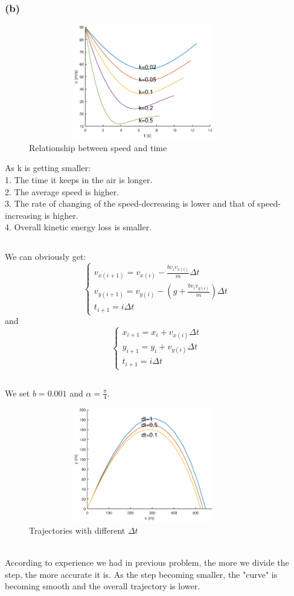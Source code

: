 \documentclass{article}
\begin{document}
\subsubsection*{(b)}
\begin{figure}[!htb] 
\centering 
\includegraphics[height=5cm,width=10cm]{linear_figure4_2.eps}
\caption{Relationship between speed and time}
\end{figure}
\noindent As k is getting smaller:\\
1. The time it keeps in the air is longer.\\
2. The average speed is higher.\\
3. The rate of changing of the speed-decreasing is lower and that of speed-increasing is higher. \\
4. Overall kinetic energy loss is smaller.
\subsection{}
We can obviously get:
$$\begin{cases}
v_{x(i+1)}=v_{x(i)}-\frac{bv_iv_{x(i)}}{m}\Delta t\\
v_{y(i+1)}=v_{y(i)}-(g+\frac{bv_iv_{y(i)}}{m})\Delta t\\
t_{i+1}=i\Delta t
\end{cases}$$
and
$$\begin{cases}
x_{i+1}=x_i+v_{x(i)}\Delta t\\
y_{i+1}=y_i+v_{y(i)}\Delta t\\
t_{i+1}=i\Delta t
\end{cases}$$
\subsection{}
We set $b=0.001$ and $\alpha=\frac{\pi}{4}$.
\begin{figure}[!htb] 
\centering 
\includegraphics[height=5cm,width=10cm]{linear_figure6.eps}
\caption{Trajectories with different $\Delta t$}
\end{figure}
\\According to experience we had in previous problem, the more we divide the step, the more accurate it is. As the step becoming smaller, the "curve" is becoming smooth and the overall trajectory is lower.
\end{document}
